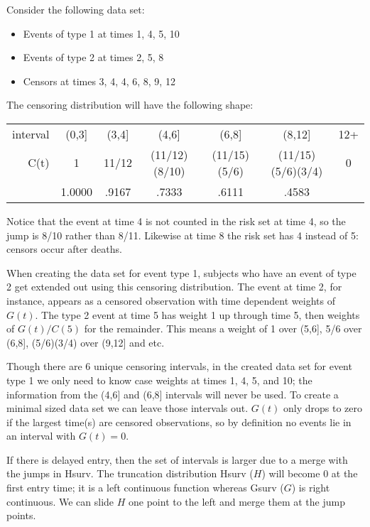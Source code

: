 \documentclass{article}
\begin{document}
Consider the following data set: 
\begin{itemize}
  \item Events of type 1 at times 1, 4, 5,  10
  \item Events of type 2 at times 2, 5, 8
  \item Censors at times 3, 4, 4, 6, 8, 9, 12
\end{itemize}
The censoring distribution will have the following shape:
\begin{center}
  \begin{tabular}{rcccccc}
    interval& (0,3]& (3,4] & (4,6]         & (6,8]       & (8,12] & 12+\\
    C(t)    &  1   &11/12  & (11/12)(8/10) & (11/15)(5/6)&  (11/15)(5/6)(3/4)&
       0 \\
       & 1.0000 & .9167 & .7333 & .6111 & .4583
    \end{tabular}
  \end{center}
Notice that the event at time 4 is not counted in the risk set at time 4,
so the jump is 8/10 rather than 8/11. 
Likewise at time 8 the risk set has 4 instead of 5: censors occur after deaths.

When creating the data set for event type 1, subjects who have an event of
type 2 get extended out using this censoring distribution.  The event at
time 2, for instance, appears as a censored observation with time dependent
weights of $G(t)$.  The type 2 event at time 5 has weight 1 up through time 5,
then weights of $G(t)/C(5)$ for the remainder.
This means a weight of 1 over (5,6], 5/6 over (6,8], (5/6)(3/4) over (9,12]
and etc. 

Though there are 6 unique censoring intervals, 
in the created data set for event type 1 we only need to know case
weights at times 1, 4, 5, and 10; the information from the (4,6] and (6,8] 
intervals will never be used.  
To create a minimal sized data set we can leave those intervals out. 
$G(t)$ only drops to zero if the largest time(s) are censored observations, so
by definition no events lie in an interval with $G(t)=0$.

If there is delayed entry, then the set of intervals is larger due to a merge
with the jumps in Hsurv.
The truncation distribution Hsurv ($H$) will become 0 at the first entry time; 
it is a left continuous function whereas Gsurv ($G$) is right continuous.  
We can slide $H$ one point to the left and merge them at the jump points.
\end{document}
